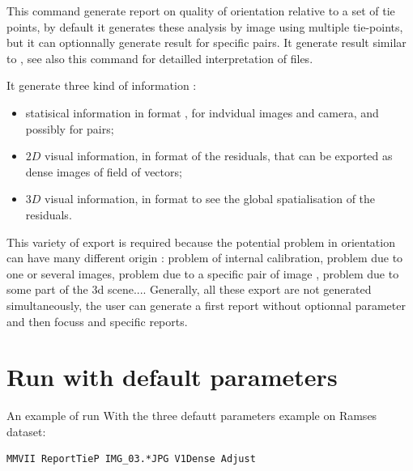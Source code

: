 \documentclass[a4paper]{article}
\begin{document}
\CmdTitle

\tableofcontents



\SecDescr

This command generate report on quality of orientation relative to a set of tie points,
by default it generates these analysis by image using multiple tie-points, but it can optionnally generate
result for specific pairs.  It generate result similar to  , see also
this command for detailled interpretation of files.

It generate three kind of information :

\begin{itemize}
  \item statisical information in  format , for indvidual images and camera, and possibly for pairs;


  \item $2D$ visual information, in   format of the residuals, that can be exported as 
       dense images of field of vectors;  

  \item $3D$ visual information, in   format to see the global spatialisation of the residuals. 
\end{itemize}

This variety of export is required because the potential problem in orientation can have many different origin :
problem of internal calibration, problem due to one or several images, problem due to a specific pair of image , problem due
to some part of the 3d scene....
Generally, all these export are not generated simultaneously, the user can generate a first report without
optionnal parameter and then focuss and specific reports.


\section{Run with default parameters}


An example of run With the three defautt parameters example on Ramses dataset:

\begin{verbatim}
MMVII ReportTieP IMG_03.*JPG V1Dense Adjust 
\end{verbatim}
\end{document}
